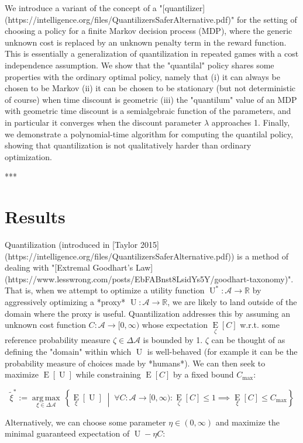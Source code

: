 \documentclass[a4paper]{article}
\newcommand{\AB}[1]{\left[#1\right]}
\newcommand{\ACM}[2]{\left\{#1\;\middle\vert\;#2\right\}}
\newcommand{\Ea}[2]{\underset{#1}{\operatorname{E}}\AB{#2}}
\newcommand{\Argmax}[1]{\underset{#1}{\operatorname{arg\,max}}\,}
\newcommand{\Reals}{\mathbb{R}}
\newcommand{\A}{\mathcal{A}}
\newcommand{\Ut}{\operatorname{U}}
\begin{document}
We introduce a variant of the concept of a "[quantilizer](https://intelligence.org/files/QuantilizersSaferAlternative.pdf)" for the setting of choosing a policy for a finite Markov decision process (MDP), where the generic unknown cost is replaced by an unknown penalty term in the reward function. This is essentially a generalization of quantilization in repeated games with a cost independence assumption. We show that the "quantilal" policy shares some properties with the ordinary optimal policy, namely that (i) it can always be chosen to be Markov (ii) it can be chosen to be stationary (but not deterministic of course) when time discount is geometric (iii) the "quantilum" value of an MDP with geometric time discount is a semialgebraic function of the parameters, and in particular it converges when the discount parameter $\lambda$ approaches 1. Finally, we demonstrate a polynomial-time algorithm for computing the quantilal policy, showing that quantilization is not qualitatively harder than ordinary optimization.

***

\section{Results}

Quantilization (introduced in [Taylor 2015](https://intelligence.org/files/QuantilizersSaferAlternative.pdf)) is a method of dealing with "[Extremal Goodhart's Law](https://www.lesswrong.com/posts/EbFABnst8LsidYs5Y/goodhart-taxonomy)". That is, when we attempt to optimize a utility function $\Ut^*: \A \rightarrow \Reals$ by aggressively optimizing a *proxy* $\Ut: \A \rightarrow \Reals$, we are likely to land outside of the domain where the proxy is useful. Quantilization addresses this by assuming an unknown cost function $C: \A \rightarrow [0,\infty)$ whose expectation $\Ea{\zeta}{C}$ w.r.t. some reference probability measure $\zeta \in \Delta\A$ is bounded by 1. $\zeta$ can be thought of as defining the "domain" within which $\Ut$ is well-behaved (for example it can be the probability measure of choices made by *humans*). We can then seek to maximize $\Ea{}{\Ut}$ while constraining $\Ea{}{C}$ by a fixed bound $C_{\max}$:

$$\tilde{\xi}^* := \Argmax{\xi \in \Delta\A}\ACM{\Ea{\xi}{\Ut}}{\forall C: \A \rightarrow [0,\infty): \Ea{\zeta}{C} \leq 1 \implies \Ea{\xi}{C} \leq C_{\max}}$$

Alternatively, we can choose some parameter $\eta\in(0,\infty)$ and maximize the minimal guaranteed expectation of $\Ut-\eta C$:
\end{document}
